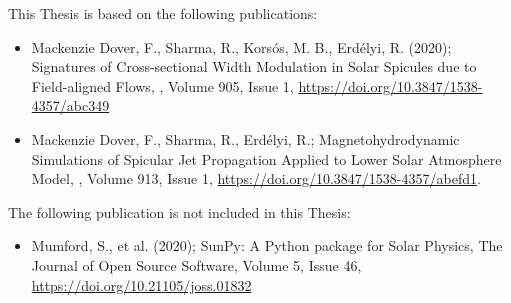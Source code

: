 \begin{publications}

This Thesis is based on the following publications:

\begin{itemize}
\item Mackenzie Dover, F., Sharma, R., Kors{\'o}s, M. B., Erd\'elyi, R. (2020); Signatures of Cross-sectional Width Modulation in Solar Spicules due to Field-aligned Flows, \apj, Volume 905, Issue 1, \url{https://doi.org/10.3847/1538-4357/abc349}

\item Mackenzie Dover, F., Sharma, R., Erd\'elyi, R.; Magnetohydrodynamic Simulations of Spicular Jet Propagation Applied to Lower Solar Atmosphere Model, \apj, Volume 913, Issue 1, \url{https://doi.org/10.3847/1538-4357/abefd1}.
\end{itemize}

The following publication is not included in this Thesis:

\begin{itemize}
\item Mumford, S., et al. (2020); SunPy: A Python package for Solar Physics, The Journal of Open Source Software, Volume 5, Issue 46, \url{https://doi.org/10.21105/joss.01832}
\end{itemize}

\end{publications}